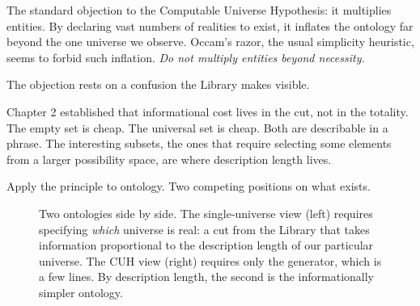 The standard objection to the Computable Universe Hypothesis: it multiplies entities. By declaring vast numbers of realities to exist, it inflates the ontology far beyond the one universe we observe. Occam's razor, the usual simplicity heuristic, seems to forbid such inflation. \emph{Do not multiply entities beyond necessity.}

The objection rests on a confusion the Library makes visible.

Chapter 2 established that informational cost lives in the cut, not in the totality. The empty set is cheap. The universal set is cheap. Both are describable in a phrase. The interesting subsets, the ones that require selecting some elements from a larger possibility space, are where description length lives.

Apply the principle to ontology. Two competing positions on what exists.

\begin{figure}[h]
\centering
{}
\caption{Two ontologies side by side. The single-universe view (left) requires specifying \emph{which} universe is real: a cut from the Library that takes information proportional to the description length of our particular universe. The CUH view (right) requires only the generator, which is a few lines. By description length, the second is the informationally simpler ontology.}
\label{fig:cut-argument}
\end{figure}

